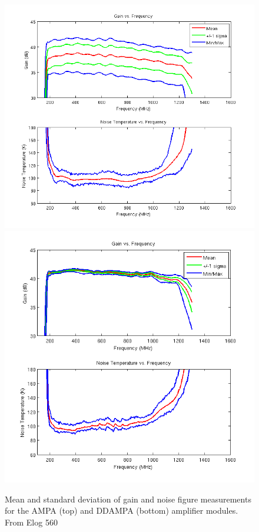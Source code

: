 \begin{figure}
\centering
	\includegraphics[height=0.45\textheight]{figures/ampas_std}
	\includegraphics[height=0.45\textheight]{figures/ddampas_std}	
	\caption{Mean and standard deviation of gain and noise figure measurements for the AMPA (top) and DDAMPA (bottom) amplifier modules.  From Elog 560}
	\label{fig:AMPAandDDAMPA_std}
\end{figure}	
	
